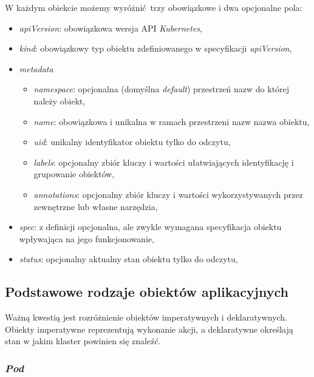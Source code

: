 \documentclass[a4paper,12pt,twoside,openany]{report}
\providecommand{\tightlist}{%
  \setlength{\itemsep}{0pt}\setlength{\parskip}{0pt}}
\begin{document}
W każdym obiekcie możemy wyróżnić~trzy obowiązkowe i dwa opcjonalne
pola:

\begin{itemize}
\tightlist
\item
  \emph{apiVersion}: obowiązkowa wersja API \emph{Kubernetes},
\item
  \emph{kind}: obowiązkowy typ obiektu zdefiniowanego w specyfikacji
  \emph{apiVersion},
\item
  \emph{metadata}

  \begin{itemize}
  \tightlist
  \item
    \emph{namespace}: opcjonalna (domyślna \emph{default}) przestrzeń
    nazw do której należy obiekt,
  \item
    \emph{name}: obowiązkowa i unikalna w ramach przestrzeni nazw nazwa
    obiektu,
  \item
    \emph{uid}: unikalny identyfikator obiektu tylko do odczytu,
  \item
    \emph{labels}: opcjonalny zbiór kluczy i wartości ułatwiających
    identyfikację i grupowanie obiektów,
  \item
    \emph{annotations}: opcjonalny zbiór kluczy i wartości
    wykorzystywanych przez zewnętrzne lub własne narzędzia,\\
  \end{itemize}
\item
  \emph{spec}: z definicji opcjonalna, ale zwykle wymagana specyfikacja
  obiektu wpływająca na jego funkcjonowanie,
\item
  \emph{status}: opcjonalny aktualny stan obiektu tylko do odczytu,
\end{itemize}

\hypertarget{podstawowe-rodzaje-obiektuxf3w-aplikacyjnych}{%
\subsection{Podstawowe rodzaje obiektów
aplikacyjnych}\label{podstawowe-rodzaje-obiektuxf3w-aplikacyjnych}}

Ważną kwestią jest rozróżnienie obiektów imperatywnych i deklaratywnych.
Obiekty imperatywne reprezentują wykonanie akcji, a deklaratywne
określają stan w jakim klaster powinien się znaleźć.

\hypertarget{pod}{%
\subsubsection{\texorpdfstring{\emph{Pod}}{Pod}}\label{pod}}
\end{document}
